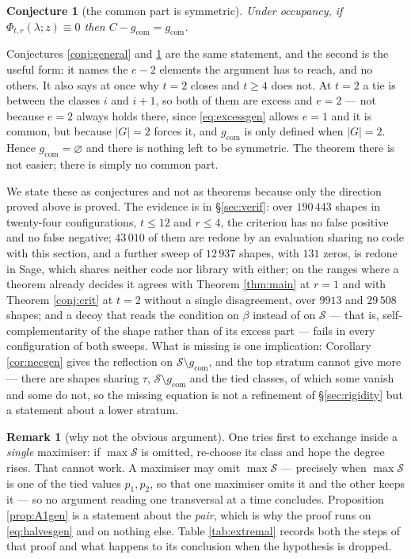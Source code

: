 \documentclass[11pt,reqno]{amsart}
\theoremstyle{plain}
\newtheorem{conjecture}[theorem]{Conjecture}
\theoremstyle{definition}
\newtheorem{remark}[theorem]{Remark}
\begin{document}
\begin{conjecture}[the common part is symmetric]\label{conj:gcom}
Under occupancy, if $\Phi_{t,r}(\lambda;z)\equiv0$ then $C-g_{\mathrm{com}}=g_{\mathrm{com}}$.
\end{conjecture}

\noindent Conjectures \ref{conj:general} and \ref{conj:gcom} are the same statement, and the second
is the useful form: it names the $e-2$ elements the argument has to reach, and no others. It also
says at once why $t=2$ closes and $t\ge4$ does not. At $t=2$ a tie is between the classes $i$ and
$i+1$, so both of them are excess and $e=2$ --- not because $e=2$ always holds there, since
\eqref{eq:excessgen} allows $e=1$ and it is common, but because $|G|=2$ forces it, and $g_{\mathrm{com}}$
is only defined when $|G|=2$. Hence $g_{\mathrm{com}}=\varnothing$ and there is nothing left to be
symmetric. The theorem there is not easier; there is simply no common part.

We state these as conjectures and not as theorems because only the direction proved above is
proved. The evidence is in \S\ref{sec:verif}: over $190\,443$ shapes in twenty-four configurations,
$t\le12$ and $r\le4$, the criterion has no false positive and no false negative; $43\,010$ of
them are redone by an evaluation sharing no code with this section, and a further sweep of
$12\,937$ shapes, with $131$ zeros, is redone in Sage, which shares neither code nor library with
either; on the ranges where a theorem
already decides it agrees with Theorem \ref{thm:main} at $r=1$ and with Theorem \ref{conj:crit} at
$t=2$ without a single disagreement, over $9913$ and $29\,508$ shapes; and a decoy that reads the
condition on $\beta$ instead of on $\mathcal{S}$ --- that is, self-complementarity of the shape
rather than of its excess part --- fails in every configuration of both sweeps. What is missing is one implication:
Corollary \ref{cor:necgen} gives the reflection on $\mathcal{S}\setminus g_{\mathrm{com}}$, and the
top stratum cannot give more --- there are shapes sharing $\tau$, $\mathcal{S}\setminus
g_{\mathrm{com}}$ and the tied classes, of which some vanish and some do not, so the missing
equation is not a refinement of \S\ref{sec:rigidity} but a statement about a lower stratum.

\begin{remark}[why not the obvious argument]
One tries first to exchange inside a \emph{single} maximiser: if $\max\mathcal{S}$ is omitted,
re-choose its class and hope the degree rises. That cannot work. A maximiser may omit
$\max\mathcal{S}$ --- precisely when $\max\mathcal{S}$ is one of the tied values $p_1,p_2$, so that
one maximiser omits it and the other keeps it --- so no argument reading one transversal at a time
concludes. Proposition \ref{prop:A1gen} is a statement about the \emph{pair}, which is why the proof
runs on \eqref{eq:halvesgen} and on nothing else. Table \ref{tab:extremal} records both the steps of
that proof and what happens to its conclusion when the hypothesis is dropped.
\end{remark}
\end{document}
